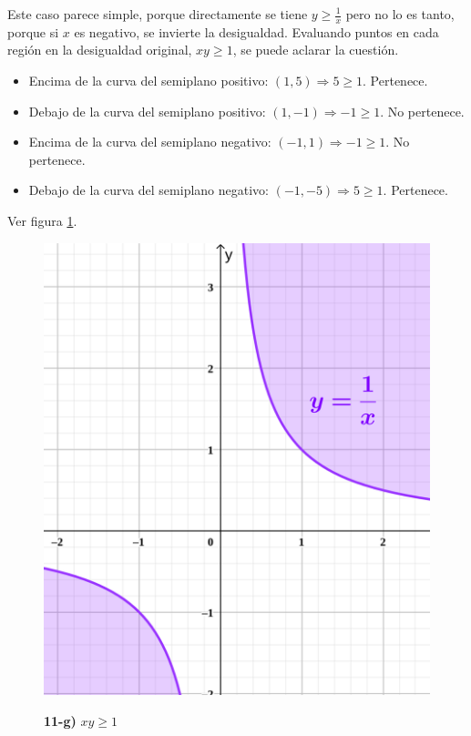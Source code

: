 \documentclass{article}
\begin{document}
Este caso parece simple, porque directamente se tiene $y \geq \frac{1}{x}$ pero no lo es tanto, porque si $x$ es negativo, se invierte la desigualdad. Evaluando puntos en cada región en la desigualdad original, $x y \geq 1$, se puede aclarar la cuestión.

\begin{itemize}
\item Encima de la curva del semiplano positivo: $(1, 5) \Rightarrow 5 \geq 1$. Pertenece.
\item Debajo de la curva del semiplano positivo: $(1, -1) \Rightarrow -1 \geq 1$. No pertenece.
\item Encima de la curva del semiplano negativo: $(-1, 1) \Rightarrow -1 \geq 1$. No pertenece.
\item Debajo de la curva del semiplano negativo: $(-1, -5) \Rightarrow 5 \geq 1$. Pertenece.
\end{itemize}

Ver figura \ref{fig:1-11-g}.

\begin{figure}[ht]
\caption{\textbf{11-g)} $x y \geq 1$}
\includegraphics[scale=0.75]{img/ejercicios/1/11-g.png} 
\centering
\label{fig:1-11-g}
\end{figure}
\end{document}
